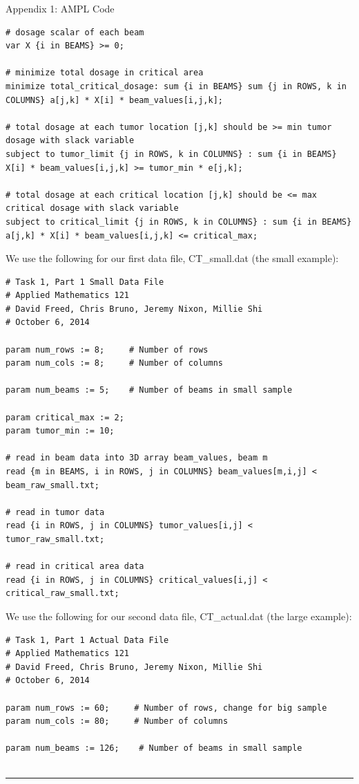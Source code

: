 \documentclass[12pt]{article}
\makeatletter
\newenvironment{task}{\@startsection
       {section}{1}
       {0.4em}{-.5ex plus -1ex minus -.2ex}{.5ex plus .2ex}
       {\pagebreak[3]\large\bf\noindent{Task}}}
       {\nopagebreak[3]\vspace{3ex}\begin{center}\rule{1\linewidth}{.3pt}\end{center}}
\makeatother
\begin{document}
\begin{task}{Appendix 1: AMPL Code}
\begin{enumerate}
\begin{lstlisting}
# dosage scalar of each beam
var X {i in BEAMS} >= 0;

# minimize total dosage in critical area
minimize total_critical_dosage: sum {i in BEAMS} sum {j in ROWS, k in COLUMNS} a[j,k] * X[i] * beam_values[i,j,k];

# total dosage at each tumor location [j,k] should be >= min tumor dosage with slack variable
subject to tumor_limit {j in ROWS, k in COLUMNS} : sum {i in BEAMS} X[i] * beam_values[i,j,k] >= tumor_min * e[j,k];

# total dosage at each critical location [j,k] should be <= max critical dosage with slack variable
subject to critical_limit {j in ROWS, k in COLUMNS} : sum {i in BEAMS} a[j,k] * X[i] * beam_values[i,j,k] <= critical_max;

\end{lstlisting}

We use the following for our first data file, CT\_small.dat (the small example):
\begin{lstlisting}
# Task 1, Part 1 Small Data File
# Applied Mathematics 121
# David Freed, Chris Bruno, Jeremy Nixon, Millie Shi
# October 6, 2014

param num_rows := 8;     # Number of rows
param num_cols := 8;     # Number of columns 

param num_beams := 5;    # Number of beams in small sample

param critical_max := 2;
param tumor_min := 10;

# read in beam data into 3D array beam_values, beam m
read {m in BEAMS, i in ROWS, j in COLUMNS} beam_values[m,i,j] < beam_raw_small.txt;

# read in tumor data
read {i in ROWS, j in COLUMNS} tumor_values[i,j] < tumor_raw_small.txt;

# read in critical area data
read {i in ROWS, j in COLUMNS} critical_values[i,j] < critical_raw_small.txt;
\end{lstlisting}

We use the following for our second data file, CT\_actual.dat (the large example):
\begin{lstlisting}
# Task 1, Part 1 Actual Data File
# Applied Mathematics 121
# David Freed, Chris Bruno, Jeremy Nixon, Millie Shi
# October 6, 2014

param num_rows := 60;     # Number of rows, change for big sample
param num_cols := 80;     # Number of columns 

param num_beams := 126;    # Number of beams in small sample


\end{lstlisting}
\end{enumerate}
\end{task}
\end{document}
